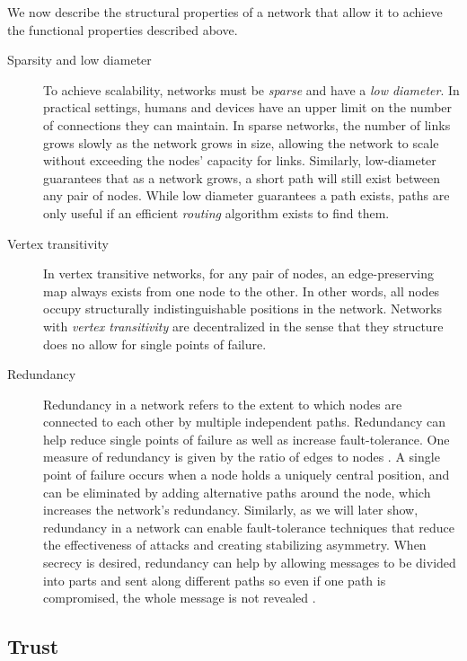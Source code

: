 \documentclass{sig-alternate-05-2015}
\begin{document}
We now describe the structural properties of a network that allow it to achieve the functional properties described above. 
\begin{description}
\item [Sparsity and low diameter]
To achieve scalability, networks must be {\em sparse} and have a
{\em low diameter}.
In practical settings, humans and devices have an upper limit on the number
of connections they can maintain.
In sparse networks, the number of links grows slowly as the network grows in
size, allowing the network to scale without exceeding the nodes' capacity for
links.
Similarly, low-diameter guarantees that as a network grows, a short path will
still exist between any pair of nodes.
While low diameter guarantees a path exists,
paths are only useful if an efficient {\em routing} algorithm exists
to find them.

\item [Vertex transitivity]
In vertex transitive networks, for any pair of nodes, an edge-preserving map
always exists from one node to the other.
In other words, all nodes occupy structurally indistinguishable positions
in the network. Networks with {\em vertex transitivity} are decentralized in the sense that they structure does no allow for  single points of failure.

\item [Redundancy]
Redundancy in a network refers to the extent to which nodes are connected to each other by multiple independent paths. Redundancy can help reduce single points of failure as well as
increase fault-tolerance.
One measure of redundancy is given by the ratio of edges to nodes
\cite{baran_distributed_1964}.
A single point of failure occurs when a node holds a uniquely
central position,
and can be eliminated by adding alternative
paths around the node,
which increases the network's redundancy.
Similarly, as we will later show, redundancy in a network can enable fault-tolerance techniques
that reduce the effectiveness of attacks and creating stabilizing asymmetry.
When secrecy is desired, redundancy can help by allowing messages to be
divided into parts and sent along different paths so even if one path is
compromised, the whole message is not revealed \cite{}. 

\end{description}

\subsection{Trust}
\end{document}
